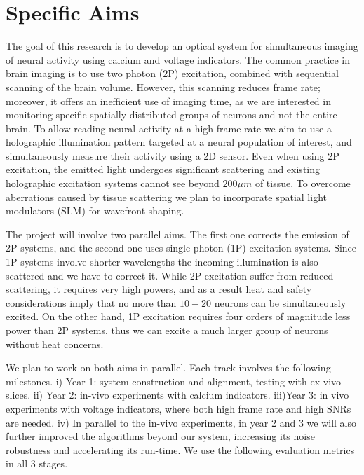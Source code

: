 \section*{Specific Aims}

The goal of this research is to develop an optical system for simultaneous imaging of neural activity using calcium and voltage indicators. 
The common practice in brain imaging is to use two photon (2P) excitation,  combined with sequential scanning of the brain volume. However, this scanning reduces frame rate; moreover, it offers an inefficient  use of imaging time, as we are  interested in monitoring specific spatially distributed groups of neurons and not the entire brain.
To allow reading neural activity at a high frame rate we aim to
use a holographic illumination pattern targeted at a neural population of interest, and simultaneously measure their activity using a 2D sensor. 
 Even when using 2P excitation, the emitted light  undergoes significant scattering and existing  holographic excitation systems cannot see beyond $200\mu m$ of tissue.
 To overcome aberrations caused by tissue scattering we plan to incorporate spatial light modulators (SLM) for wavefront shaping. 

The project will involve two parallel aims. The first one corrects the emission of 2P systems, and the second one uses single-photon (1P) excitation systems. Since 1P systems involve shorter wavelengths the incoming illumination is also scattered  and we  have to correct it. 
While 2P excitation suffer  from reduced scattering, it requires very high powers, and as a result heat and safety considerations imply that no more than $10-20$ neurons can be simultaneously excited.  
On the other hand, 1P excitation requires four orders of magnitude less power than 2P systems, thus we can excite a much larger group of neurons without heat concerns.
	
We plan to work on both aims in parallel. Each track involves the following milestones. i) Year 1: system construction and alignment,  testing with ex-vivo   slices. ii) Year 2: in-vivo experiments with calcium indicators. iii)Year 3: in vivo experiments with voltage indicators, where both high frame rate and high SNRs are needed. iv) In parallel to the in-vivo experiments, in year 2 and 3 we will also further improved the algorithms beyond our system, increasing its noise robustness and accelerating its run-time.    We use the following evaluation metrics in all 3 stages. 



